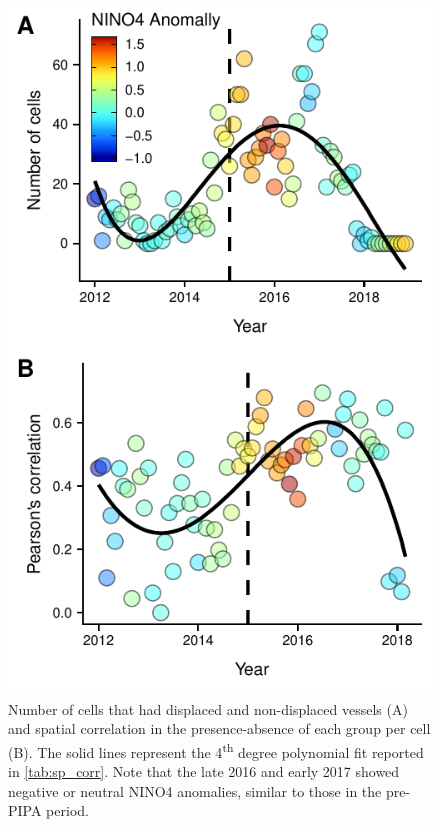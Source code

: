 \documentclass[9p,twocolumn,twoside,lineno]{pnas-new}
\begin{document}
\clearpage





\begin{figure}[H]
\centering
\includegraphics{img/KIR_sp_corr.pdf}
\caption{\label{fig:KIR_sp_corr}Number of cells that had displaced and non-displaced vessels (A) and spatial correlation in the presence-absence of each group per cell (B). The solid lines represent the 4\textsuperscript{th} degree polynomial fit reported in \ref{tab:sp_corr}. Note that the late 2016 and early 2017 showed negative or neutral NINO4 anomalies, similar to those in the pre-PIPA period.}
\end{figure}
\end{document}
